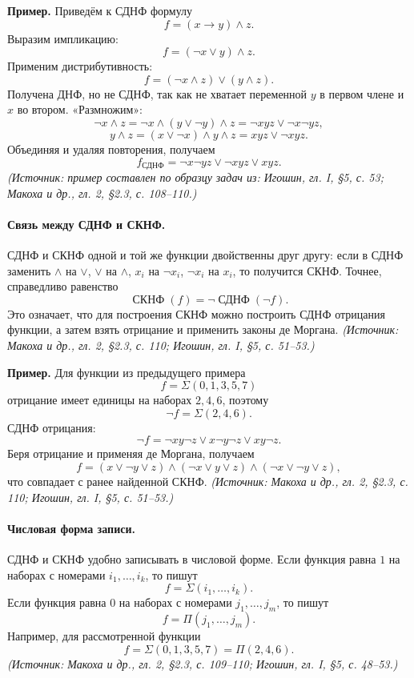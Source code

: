 \documentclass[a4paper,12pt]{article}
\begin{document}
\textbf{Пример.} Приведём к СДНФ формулу
\[
f=(x\to y)\land z.
\]
Выразим импликацию:
\[
f=(\neg x\lor y)\land z.
\]
Применим дистрибутивность:
\[
f=(\neg x\land z)\lor(y\land z).
\]
Получена ДНФ, но не СДНФ, так как не хватает переменной \(y\) в первом члене и \(x\) во втором. «Размножим»:
\[
\neg x\land z
=
\neg x\land(y\lor\neg y)\land z
=
\neg x y z\lor\neg x\neg y z,
\]
\[
y\land z
=
(x\lor\neg x)\land y\land z
=
x y z\lor\neg x y z.
\]
Объединяя и удаляя повторения, получаем
\[
f_{\text{СДНФ}}
=
\neg x\neg y z\lor\neg x y z\lor x y z.
\]
\textit{(Источник: пример составлен по образцу задач из: Игошин, гл. I, §5, с. 53; Макоха и др., гл. 2, §2.3, с. 108--110.)}

\paragraph{Связь между СДНФ и СКНФ.}
СДНФ и СКНФ одной и той же функции двойственны друг другу: если в СДНФ заменить \(\land\) на \(\lor\), \(\lor\) на \(\land\), \(x_i\) на \(\neg x_i\), \(\neg x_i\) на \(x_i\), то получится СКНФ. Точнее, справедливо равенство
\[
\operatorname{СКНФ}(f)=\neg\operatorname{СДНФ}(\neg f).
\]
Это означает, что для построения СКНФ можно построить СДНФ отрицания функции, а затем взять отрицание и применить законы де Моргана.
\textit{(Источник: Макоха и др., гл. 2, §2.3, с. 110; Игошин, гл. I, §5, с. 51--53.)}

\textbf{Пример.} Для функции из предыдущего примера
\[
f=\Sigma(0,1,3,5,7)
\]
отрицание имеет единицы на наборах \(2,4,6\), поэтому
\[
\neg f=\Sigma(2,4,6).
\]
СДНФ отрицания:
\[
\neg f=\neg x y\neg z\lor x\neg y\neg z\lor x y\neg z.
\]
Беря отрицание и применяя де Моргана, получаем
\[
f=(x\lor\neg y\lor z)\land(\neg x\lor y\lor z)\land(\neg x\lor\neg y\lor z),
\]
что совпадает с ранее найденной СКНФ.
\textit{(Источник: Макоха и др., гл. 2, §2.3, с. 110; Игошин, гл. I, §5, с. 51--53.)}

\paragraph{Числовая форма записи.}
СДНФ и СКНФ удобно записывать в числовой форме. Если функция равна \(1\) на наборах с номерами \(i_1,\ldots,i_k\), то пишут
\[
f=\Sigma(i_1,\ldots,i_k).
\]
Если функция равна \(0\) на наборах с номерами \(j_1,\ldots,j_m\), то пишут
\[
f=\Pi(j_1,\ldots,j_m).
\]
Например, для рассмотренной функции
\[
f=\Sigma(0,1,3,5,7)=\Pi(2,4,6).
\]
\textit{(Источник: Макоха и др., гл. 2, §2.3, с. 109--110; Игошин, гл. I, §5, с. 48--53.)}
\end{document}
